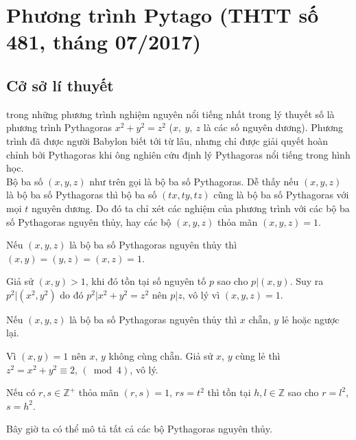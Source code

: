 \section{Phương trình Pytago (THTT số 481, tháng 07/2017)}
\begin{center}
	\textbf{\color{violet}{Ngọc Diệp\\
			THTT số 481, tháng 07/2017
	}}
\end{center}
\subsection{Cở sở lí thuyết}
 trong những phương trình nghiệm nguyên nổi tiếng nhất trong lý thuyết số là phương trình Pythagoras $x^2 +y^2 = z^2$ ($x,\ y,\ z$ là các số nguyên dương). Phương trình đã được người Babylon biết tới từ lâu, nhưng chỉ được giải quyết hoàn chỉnh bởi Pythagoras khi ông nghiên cứu định lý Pythagoras nổi tiếng trong hình học.\\
Bộ ba số $(x,y,z)$ như trên gọi là bộ ba số Pythagoras. Dễ thấy nếu $(x,y,z)$ là bộ ba số Pythagoras thì bộ ba số $(tx,ty,tz)$ cũng là bộ ba số Pythagoras với mọi $t$ nguyên dương. Do đó ta chỉ xét các nghiệm của phương trình với các bộ ba số Pythagoras nguyên thủy, hay các bộ $(x,y,z)$ thỏa mãn $(x,y,z)=1$.

\begin{bode}
	Nếu $(x,y,z)$ là bộ ba số Pythagoras nguyên thủy thì $(x,y)=(y,z)=(x,z)=1$.
\end{bode}
 Giả sử $(x,y)>1$, khi đó tồn tại số nguyên tố $p$ sao cho $p|(x,y)$. Suy ra $p^2|(x^2,y^2)$ do đó $p^2|x^2+y^2= z^2$ nên $p|z$, vô lý vì $(x,y,z)=1$.

\begin{bode}
	Nếu $(x,y,z)$ là bộ ba số Pythagoras nguyên thủy thì $x$ chẵn, $y$ lẻ hoặc ngược lại.
\end{bode}
Vì $(x,y)=1$ nên $x$, $y$ không cùng chẵn. Giả sử $x$, $y$ cùng lẻ thì $z^2 = x^2 + y^2 \equiv 2$, $(\bmod 4)$, vô lý.

\begin{bode}
	Nếu có $r,s \in \mathbb{Z}^+$ thỏa mãn $(r,s)=1$, $rs = t^2$ thì tồn tại $h,l \in \mathbb{Z}$ sao cho $r= l^2$, $s=h^2$.
\end{bode}

Bây giờ ta có thể mô tả tất cả các bộ Pythagoras nguyên thủy.

